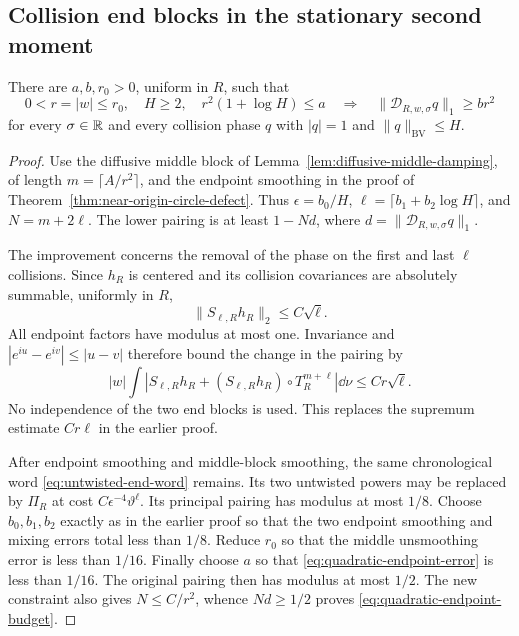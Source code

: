 \subsection{Collision end blocks in the stationary second moment}
\begin{lemma}
\label{lem:quadratic-endpoint-budget}
There are $a,b,r_0>0$, uniform in $R$, such that
\begin{equation}\label{eq:quadratic-endpoint-budget}
 0<r=|w|\le r_0,\quad H\ge2,\quad r^2(1+\log H)\le a
 \quad\Longrightarrow\quad
 \|\mathcal D_{R,w,\sigma}q\|_1\ge br^2
\end{equation}
for every $\sigma\in\mathbb R$ and every collision phase $q$ with
$|q|=1$ and $\|q\|_{\mathrm{BV}}\le H$.
\end{lemma}
\begin{proof}
Use the diffusive middle block of
Lemma~\ref{lem:diffusive-middle-damping}, of length
$m=\lceil A/r^2\rceil$, and the endpoint smoothing in the proof of
Theorem~\ref{thm:near-origin-circle-defect}. Thus
$\epsilon=b_0/H$, $\ell=\lceil b_1+b_2\log H\rceil$, and
$N=m+2\ell$. The lower pairing is at least $1-Nd$, where
$d=\|\mathcal D_{R,w,\sigma}q\|_1$.

The improvement concerns the removal of the phase on the first and
last $\ell$ collisions. Since $h_R$ is centered and its collision
covariances are absolutely summable, uniformly in $R$,
\[
 \|S_{\ell,R}h_R\|_2\le C\sqrt\ell.
\]
All endpoint factors have modulus at most one. Invariance and
$|e^{iu}-e^{iv}|\le|u-v|$ therefore bound the change in the pairing by
\begin{equation}\label{eq:quadratic-endpoint-error}
 |w|\int\left|S_{\ell,R}h_R+
       (S_{\ell,R}h_R)\circ T_R^{m+\ell}\right|\dd\nu
       \le Cr\sqrt\ell.
\end{equation}
No independence of the two end blocks is used. This replaces the
supremum estimate $C r\ell$ in the earlier proof.

After endpoint smoothing and middle-block smoothing, the same
chronological word \eqref{eq:untwisted-end-word} remains. Its two
untwisted powers may be replaced by $\Pi_R$ at cost
$C\epsilon^{-4}\vartheta^\ell$. Its principal pairing has modulus at
most $1/8$. Choose $b_0,b_1,b_2$ exactly as in the earlier proof so
that the two endpoint smoothing and mixing errors total less than
$1/8$. Reduce $r_0$ so that the middle unsmoothing error is less than
$1/16$. Finally choose $a$ so that \eqref{eq:quadratic-endpoint-error}
is less than $1/16$. The original pairing then has modulus at most
$1/2$. The new constraint also gives $N\le C/r^2$, whence
$Nd\ge1/2$ proves \eqref{eq:quadratic-endpoint-budget}.
\end{proof}

